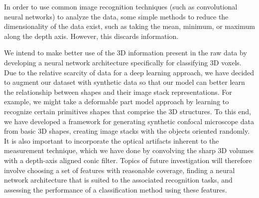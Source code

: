 \documentclass{article}
\begin{document}
In order to use common image recognition techniques (such as convolutional neural networks) to analyze the data, some simple methods to reduce the dimensionality of the data exist, such as taking the mean, minimum, or maximum along the depth axis. However, this discards information. 

We intend to make better use of the 3D information present in the raw data by developing a neural network architecture specifically for classifying 3D voxels\cite{DBLP:conf/iros/MaturanaS15,brock2016generative}. Due to the relative scarcity of data for a deep learning approach, we have decided to augment our dataset with synthetic data so that our model can better learn the relationship between shapes and their image stack representations. For example, we might take a deformable part model approach by learning to recognize certain primitives shapes that comprise the 3D structures. To this end, we have developed a framework for generating synthetic confocal microscope data from basic 3D shapes, creating image stacks with the objects oriented randomly. It is also important to incorporate the optical artifacts inherent to the measurement technique, which we have done by convolving the sharp 3D volumes with a depth-axis aligned conic filter. Topics of future investigation will therefore involve choosing a set of features with reasonable coverage, finding a neural network architecture that is suited to the associated recognition tasks, and assessing the performance of a classification method using these features.



\end{document}
